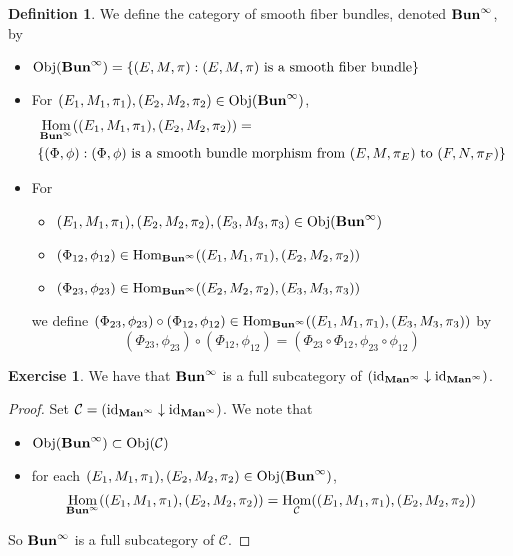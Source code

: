 \documentclass{book}
\theoremstyle{definition}
\newtheorem{defn}[definition]{Definition}
\newtheorem{ex}[definition]{Exercise}
\newcommand{\MC}{\mathcal{C}}
\DeclareMathOperator{\id}{id}
\DeclareMathOperator{\Obj}{Obj}
\DeclareMathOperator{\Hom}{Hom}
\DeclareMathOperator*{\Maninf}{\text{\tbf{Man}}^{\infty}}
\DeclareMathOperator*{\Buninf}{\text{\tbf{Bun}}^{\infty}}
\DeclareMathOperator*{\0}{\mbf{0}}
\DeclareMathOperator*{\1}{\mbf{1}}
\newcommand{\tbf}[1]{\textbf{#1}}
\begin{document}
	\begin{defn}
		We define the category of smooth fiber bundles, denoted $\Buninf$, by 
		\begin{itemize}
			\item $\Obj(\Buninf) = \{(E, M, \pi): (E, M, \pi) \text{ is a smooth fiber bundle}\}$ 
			\item For $(E_1, M_1, \pi_1), (E_2, M_2, \pi_2) \in \Obj(\Buninf)$, 
			\begin{align*}
				& \Hom_{\Buninf}((E_1, M_1, \pi_1), (E_2, M_2, \pi_2)) = \\
				& \{(\Phi, \phi): (\Phi, \phi) \text{ is a smooth bundle morphism from $(E, M, \pi_E)$ to $(F, N, \pi_F)$} \}
			\end{align*}
			\item For 
			\begin{itemize}
				\item $(E_1, M_1, \pi_1), (E_2, M_2, \pi_2), (E_3, M_3, \pi_3) \in \Obj(\Buninf)$ 
				\item $(\Phi_{12}, \phi_{12}) \in \Hom_{\Buninf}((E_1, M_1, \pi_1), (E_2, M_2, \pi_2))$
				\item $(\Phi_{23}, \phi_{23}) \in \Hom_{\Buninf}((E_2, M_2, \pi_2), (E_3, M_3, \pi_3))$ 
			\end{itemize}
			we define $(\Phi_{23}, \phi_{23}) \circ (\Phi_{12}, \phi_{12}) \in \Hom_{\Buninf}((E_1, M_1, \pi_1), (E_3, M_3, \pi_3))$ by 
			$$(\Phi_{23}, \phi_{23}) \circ (\Phi_{12}, \phi_{12}) = (\Phi_{23} \circ \Phi_{12}, \phi_{23} \circ \phi_{12})$$
		\end{itemize}
	\end{defn}

	\begin{ex}
		We have that $\Buninf$ is a full subcategory of $(\id_{\Maninf} \downarrow \id_{\Maninf})$.
	\end{ex}
	
	\begin{proof} Set $\MC = (\id_{\Maninf} \downarrow \id_{\Maninf})$. We note that 
		\begin{itemize}
			\item $\Obj(\Buninf) \subset \Obj(\MC)$
			\item for each $(E_1, M_1, \pi_1), (E_2, M_2, \pi_2) \in \Obj(\Buninf)$, 
			$$\Hom_{\Buninf}((E_1, M_1, \pi_1), (E_2, M_2, \pi_2)) = \Hom_{\MC}((E_1, M_1, \pi_1), (E_2, M_2, \pi_2))$$
		\end{itemize}
		So $\Buninf$ is a full subcategory of $\MC$.
	\end{proof}
\end{document}
